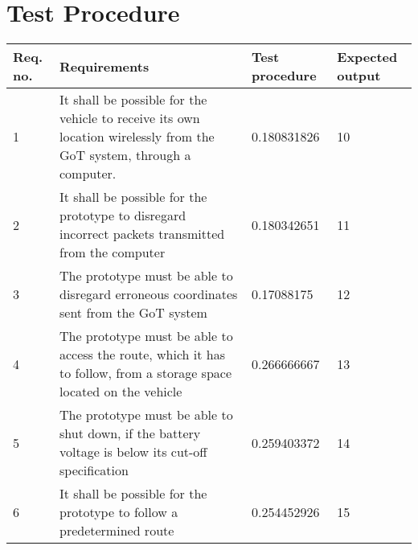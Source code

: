 \section{Test Procedure}\label{cha:TestProcedure}

\begin{table}[H] \centering
\begin{tabular}{|p{2cm}|p{5cm}|p{6cm}|p{3cm}|}
\hline%
\textbf{Req. no.}  &  \textbf{Requirements} &  \textbf{Test procedure}  &  \textbf{Expected output}        \\
\hline%
           1    &   It shall be possible for the vehicle to receive its own location wirelessly from the GoT system, through a computer.   &   0.180831826   &   10                \\
\hline%
           2    &   It shall be possible for the prototype to disregard incorrect packets transmitted from the computer   &   0.180342651   &  11               \\
\hline%
           3    &   The prototype must be able to disregard erroneous coordinates sent from the GoT system   &    0.17088175   &  12           \\
\hline%
           4    &   The prototype must be able to access the route, which it has to follow, from a storage space located on the vehicle &   0.266666667   &   13                  \\
\hline%
           5    &   The prototype must be able to shut down, if the battery voltage is below its cut-off specification &   0.259403372   &   14               \\
\hline%
           6    &   It shall be possible for the prototype to follow a predetermined route &   0.254452926   &    15                \\

\end{tabular}
\end{table}
